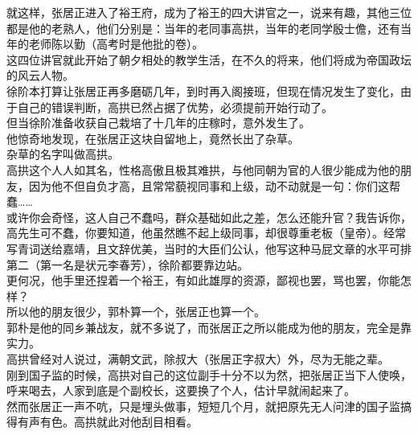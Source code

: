 \begin{multicols}{\theparacolNo}
就这样，张居正进入了裕王府，成为了裕王的四大讲官之一，说来有趣，其他三位都是他的老熟人，他们分别是：当年的老同事高拱，当年的老同学殷士儋，还有当年的老师陈以勤（高考时是他批的卷）。\\

这四位讲官就此开始了朝夕相处的教学生活，在不久的将来，他们将成为帝国政坛的风云人物。\\

徐阶本打算让张居正再多磨砺几年，到时再入阁接班，但现在情况发生了变化，由于自己的错误判断，高拱已然占据了优势，必须提前开始行动了。\\

但当徐阶准备收获自己栽培了十几年的庄稼时，意外发生了。\\

他惊奇地发现，在张居正这块自留地上，竟然长出了杂草。\\

杂草的名字叫做高拱。\\

高拱这个人人如其名，性格高傲且极其难拱，与他同朝为官的人很少能成为他的朋友，因为他不但自负才高，且常常藐视同事和上级，动不动就是一句：你们这帮蠢……\\

或许你会奇怪，这人自己不蠢吗，群众基础如此之差，怎么还能升官？我告诉你，高先生可不蠢，你要知道，他虽然瞧不起上级同事，却很尊重老板（皇帝）。经常写青词送给嘉靖，且文辞优美，当时的大臣们公认，他写这种马屁文章的水平可排第二（第一名是状元李春芳），徐阶都要靠边站。\\

更何况，他手里还捏着一个裕王，有如此雄厚的资源，鄙视也罢，骂也罢，你能怎样？\\

所以他的朋友很少，郭朴算一个，张居正也算一个。\\

郭朴是他的同乡兼战友，就不多说了，而张居正之所以能成为他的朋友，完全是靠实力。\\

高拱曾经对人说过，满朝文武，除叔大（张居正字叔大）外，尽为无能之辈。\\

刚到国子监的时候，高拱对自己的这位副手十分不以为然，把张居正当下人使唤，呼来喝去，人家到底是个副校长，这要换了个人，估计早就闹起来了。\\

然而张居正一声不吭，只是埋头做事，短短几个月，就把原先无人问津的国子监搞得有声有色。高拱就此对他刮目相看。\\


\end{multicols}

